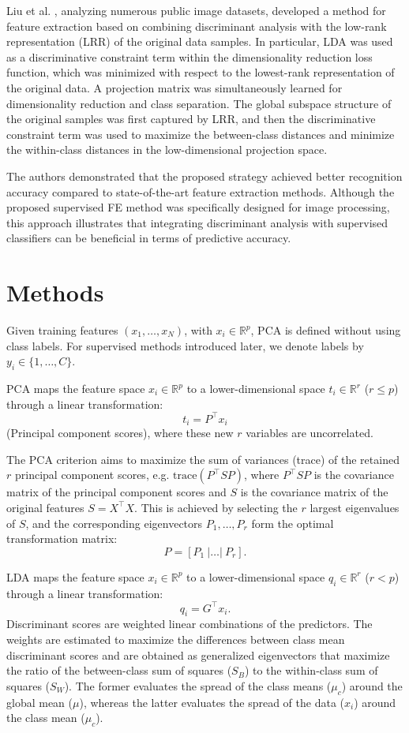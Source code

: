 \documentclass[11pt,a4paper]{article}
\begin{document}
Liu et al. \citep{liu2019discriminative}, analyzing numerous public image datasets, developed a method for feature extraction based on combining discriminant analysis with the low-rank representation (LRR) of the original data samples.  
In particular, LDA was used as a discriminative constraint term within the dimensionality reduction loss function, which was minimized with respect to the lowest-rank representation of the original data.  
A projection matrix was simultaneously learned for dimensionality reduction and class separation.  
The global subspace structure of the original samples was first captured by LRR, and then the discriminative constraint term was used to maximize the between-class distances and minimize the within-class distances in the low-dimensional projection space.

The authors demonstrated that the proposed strategy achieved better recognition accuracy compared to state-of-the-art feature extraction methods.  
Although the proposed supervised FE method was specifically designed for image processing, this approach illustrates that integrating discriminant analysis with supervised classifiers can be beneficial in terms of predictive accuracy.



\section{Methods}


Given training features $(x_1, \dots, x_N)$, with $x_i \in \mathbb{R}^p$, PCA is defined without using class labels. For supervised methods introduced later, we denote labels by $y_i \in \{1,\dots,C\}$.  

PCA maps the feature space $x_i \in \mathbb{R}^p$ to a lower-dimensional space $t_i \in \mathbb{R}^r$ ($r \leq p$) through a linear transformation:
\[
t_i = P^\top x_i
\]
(Principal component scores), where these new $r$ variables are uncorrelated.

The PCA criterion aims to maximize the sum of variances (trace) of the retained $r$ principal component scores, e.g. $\text{trace}(P^\top S P)$, where $P^\top S P$ is the covariance matrix of the principal component scores and $S$ is the covariance matrix of the original features $S = X^\top X$.  
This is achieved by selecting the $r$ largest eigenvalues of $S$, and the corresponding eigenvectors $P_1, \dots, P_r$ form the optimal transformation matrix:
\[
P = [P_1 \ | \dots | \ P_r].
\]

LDA maps the feature space $x_i \in \mathbb{R}^p$ to a lower-dimensional space $q_i \in \mathbb{R}^r$ ($r < p$) through a linear transformation:
\[
q_i = G^\top x_i.
\]
Discriminant scores are weighted linear combinations of the predictors.  
The weights are estimated to maximize the differences between class mean discriminant scores and are obtained as generalized eigenvectors that maximize the ratio of the between-class sum of squares ($S_B$) to the within-class sum of squares ($S_W$).  
The former evaluates the spread of the class means ($\mu_c$) around the global mean ($\mu$), whereas the latter evaluates the spread of the data ($x_i$) around the class mean ($\mu_c$).
\end{document}
